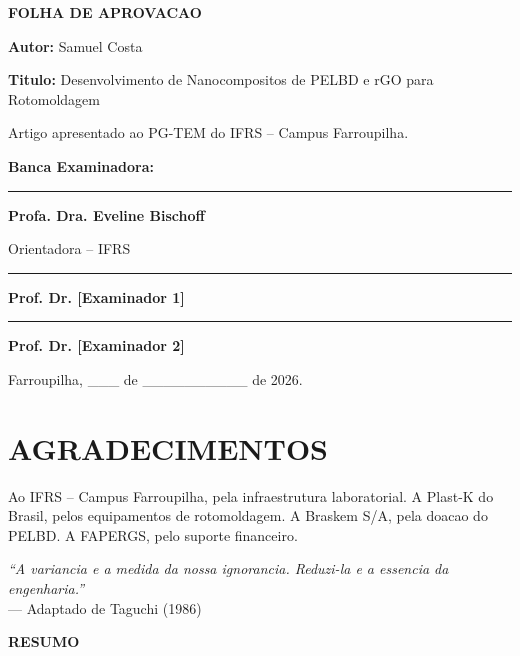 \documentclass[11pt,a4paper,oneside]{article}
\begin{document}
\newpage
\begin{center}{\large\bfseries FOLHA DE APROVACAO}\end{center}
\vspace{12pt}
{\bfseries Autor:} Samuel Costa\par\vspace{4pt}
{\bfseries Titulo:} Desenvolvimento de Nanocompositos de PELBD e rGO para Rotomoldagem\par\vspace{12pt}
Artigo apresentado ao PG-TEM do IFRS -- Campus Farroupilha.\par\vspace{18pt}
{\bfseries Banca Examinadora:}\par\vspace{18pt}
\rule{8cm}{0.4pt}\par{\bfseries Profa. Dra. Eveline Bischoff}\par Orientadora -- IFRS\par\vspace{12pt}
\rule{8cm}{0.4pt}\par{\bfseries Prof. Dr. [Examinador 1]}\par\vspace{12pt}
\rule{8cm}{0.4pt}\par{\bfseries Prof. Dr. [Examinador 2]}\par\vspace{24pt}
\begin{flushright}Farroupilha, \_\_\_ de \_\_\_\_\_\_\_\_\_\_ de 2026.\end{flushright}

\newpage
\section*{AGRADECIMENTOS}
Ao IFRS -- Campus Farroupilha, pela infraestrutura laboratorial. A Plast-K do Brasil, pelos equipamentos de rotomoldagem. A Braskem S/A, pela doacao do PELBD. A FAPERGS, pelo suporte financeiro.

\newpage
\vspace*{8cm}
\begin{flushright}\textit{``A variancia e a medida da nossa ignorancia. Reduzi-la e a essencia da engenharia.''}\\[12pt]--- Adaptado de Taguchi (1986)\end{flushright}

\newpage
\begin{center}{\large\bfseries RESUMO}\end{center}\vspace{6pt}\footnotesize
\end{document}
